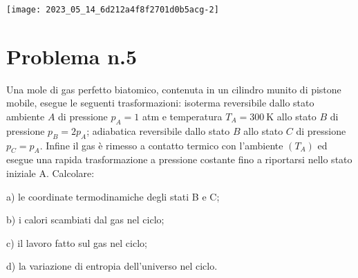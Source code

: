 \documentclass[10pt]{article}
\begin{document}
\begin{center}
\texttt{[image: 2023\_05\_14\_6d212a4f8f2701d0b5acg-2]}
\end{center}

\section{Problema n.5}
Una mole di gas perfetto biatomico, contenuta in un cilindro munito di pistone mobile, esegue le seguenti trasformazioni: isoterma reversibile dallo stato ambiente \(A\) di pressione \(p_{A}=1\) atm e temperatura \(T_{A}=300 \mathrm{~K}\) allo stato \(B\) di pressione \(p_{B}=2 p_{A}\); adiabatica reversibile dallo stato \(B\) allo stato \(C\) di pressione \(p_{C}=p_{A}\). Infine il gas è rimesso a contatto termico con l'ambiente \(\left(T_{A}\right)\) ed esegue una rapida trasformazione a pressione costante fino a riportarsi nello stato iniziale A. Calcolare:

a) le coordinate termodinamiche degli stati B e C;

b) i calori scambiati dal gas nel ciclo;

c) il lavoro fatto sul gas nel ciclo;

d) la variazione di entropia dell'universo nel ciclo.
\end{document}
